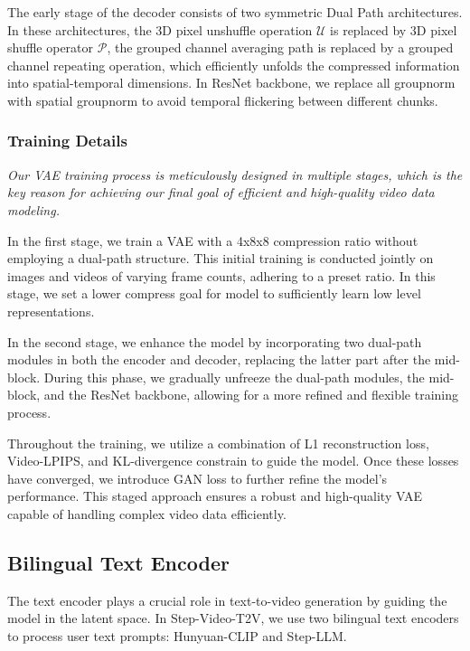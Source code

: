 The early stage of the decoder consists of two symmetric Dual Path architectures. In these architectures, the 3D pixel unshuffle operation $\mathcal{U}$ is replaced by 3D pixel shuffle operator $\mathcal{P}$, the grouped channel averaging path is replaced by a grouped channel repeating operation, which efficiently unfolds the compressed information into spatial-temporal dimensions.
In ResNet backbone, we replace all groupnorm with spatial groupnorm to avoid temporal flickering between different chunks.



\subsubsection{Training Details}

\textit{Our VAE training process is meticulously designed in multiple stages, which is the key reason for achieving our final goal of efficient and high-quality video data modeling.}

In the first stage, we train a VAE with a 4x8x8 compression ratio without employing a dual-path structure. This initial training is conducted jointly on images and videos of varying frame counts, adhering to a preset ratio. In this stage, we set a lower compress goal for model to sufficiently learn low level representations.

In the second stage, we enhance the model by incorporating two dual-path modules in both the encoder and decoder, replacing the latter part after the mid-block. During this phase, we gradually unfreeze the dual-path modules, the mid-block, and the ResNet backbone, allowing for a more refined and flexible training process.

Throughout the training, we utilize a combination of L1 reconstruction loss, Video-LPIPS, and KL-divergence constrain to guide the model. Once these losses have converged, we introduce GAN loss to further refine the model's performance. This staged approach ensures a robust and high-quality VAE capable of handling complex video data efficiently.




\subsection{Bilingual Text Encoder}\label{textencoder}
The text encoder plays a crucial role in text-to-video generation by guiding the model in the latent space. In Step-Video-T2V, we use two bilingual text encoders to process user text prompts: Hunyuan-CLIP and Step-LLM.

